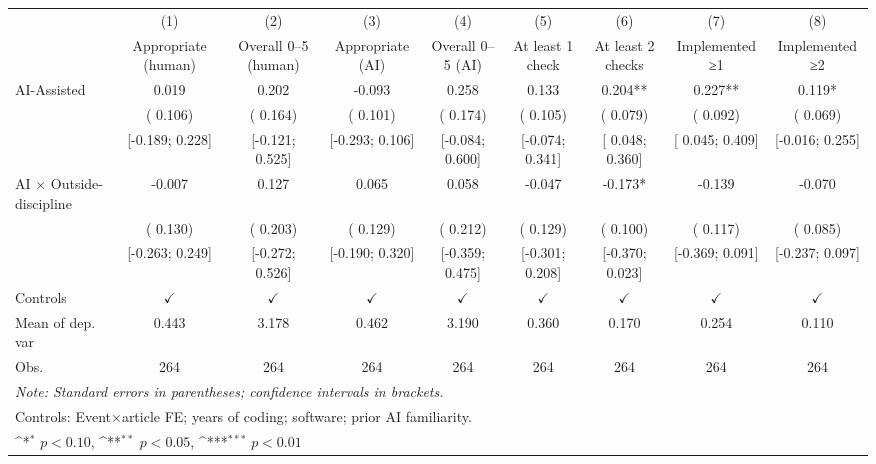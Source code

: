 \def\sym#1{\ifmmode^{#1}\else\(^{#1}\)\fi}
\begin{tabular}{l*{8}{c}}
\hline\hline
 & (1) & (2) & (3) & (4) & (5) & (6) & (7) & (8)
\\
 & Appropriate (human) & Overall 0–5 (human) & Appropriate (AI) & Overall 0–5 (AI) & At least 1 check & At least 2 checks & Implemented ≥1 & Implemented ≥2
 \\
\hline
AI-Assisted &  0.019 &  0.202 & -0.093 &  0.258 &  0.133 &  0.204** &  0.227** &  0.119*
\\
 & ( 0.106) & ( 0.164) & ( 0.101) & ( 0.174) & ( 0.105) & ( 0.079) & ( 0.092) & ( 0.069)
\\
 & [-0.189;  0.228] & [-0.121;  0.525] & [-0.293;  0.106] & [-0.084;  0.600] & [-0.074;  0.341] & [ 0.048;  0.360] & [ 0.045;  0.409] & [-0.016;  0.255]
\\
AI × Outside-discipline & -0.007 &  0.127 &  0.065 &  0.058 & -0.047 & -0.173* & -0.139 & -0.070
\\
 & ( 0.130) & ( 0.203) & ( 0.129) & ( 0.212) & ( 0.129) & ( 0.100) & ( 0.117) & ( 0.085)
\\
 & [-0.263;  0.249] & [-0.272;  0.526] & [-0.190;  0.320] & [-0.359;  0.475] & [-0.301;  0.208] & [-0.370;  0.023] & [-0.369;  0.091] & [-0.237;  0.097]
\\
\hline
Controls & $\checkmark$ & $\checkmark$ & $\checkmark$ & $\checkmark$ & $\checkmark$ & $\checkmark$ & $\checkmark$ & $\checkmark$
\\
Mean of dep. var &  0.443 &  3.178 &  0.462 &  3.190 &  0.360 &  0.170 &  0.254 &  0.110
\\
Obs. & 264 & 264 & 264 & 264 & 264 & 264 & 264 & 264
\\
\hline
\hline\hline
\multicolumn{9}{l}{\it{Note:} Standard errors in parentheses; confidence intervals in brackets.}\\
\multicolumn{9}{l}{Controls: Event×article FE; years of coding; software; prior AI familiarity.}\\
\multicolumn{9}{l}{\sym{*} $p<0.10$, \sym{**} $p<0.05$,  \sym{***} $p<0.01$}\\
\end{tabular}
